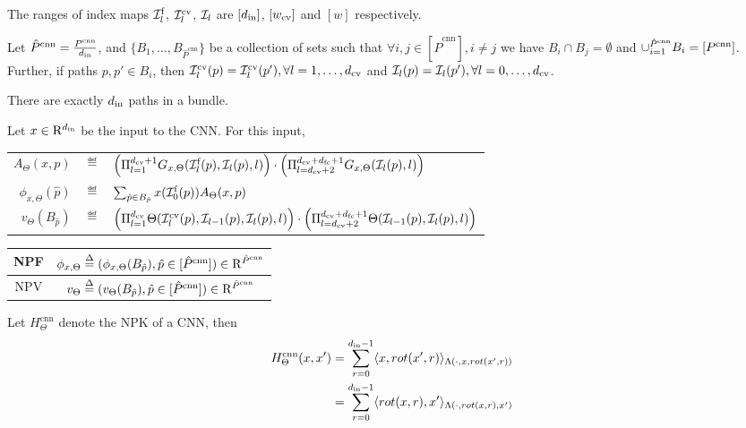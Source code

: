 \begin{notation}
The ranges of index maps $\mathcal{I}^{\text{f}}_l$,  $\mathcal{I}^{\text{cv}}_l$, $\mathcal{I}_l$ are $[d_{\text{in}}]$, $[w_{\text{cv}}]$ and $[w]$ respectively. 
\end{notation}

\begin{definition}\label{def:bundle}
Let $\hat{P}^{\text{cnn}}=\frac{P^{\text{cnn}}}{d_{\text{in}}}$, and $\{B_1,\ldots, B_{\hat{P}^{\text{cnn}}}\}$ be a collection of sets such that $\forall i,j\in [\hat{P}^{\text{cnn}}], i\neq j$ we have $B_i\cap B_j=\emptyset$ and $\cup_{i=1}^{\hat{P}^{\text{cnn}}}B_i =[P^{\text{cnn}}]$. Further,  if paths $p,p' \in B_i$, then $\mathcal{I}^{\text{cv}}_l(p)=\mathcal{I}^{\text{cv}}_l(p'), \forall l=1,\ldots, d_{\text{cv}}$ and $\mathcal{I}_l(p)=\mathcal{I}_l(p'), \forall l=0,\ldots, d_{\text{cv}}$.
\end{definition}

\begin{proposition}\label{prop:bundle}
There are exactly $d_{\text{in}}$ paths in a bundle.
\end{proposition}

\begin{definition}\label{def:convnps} Let $x\in\mathrm{R}^{d_{\text{in}}}$ be the input to the CNN. For this input, 
\begin{tabular}{rlp{4cm}}
$A_{\Theta}(x,p)$&$\eqdef$&$\left(\Pi_{l=1}^{d_{\text{cv}}+1} G_{x,\Theta}(\mathcal{I}^{\text{f}}_l(p),\mathcal{I}_l(p),l)\right)\cdot\left(\Pi_{l=d_{\text{cv}}+2}^{d_{\text{cv}}+d_{\text{fc}}+1} G_{x,\Theta}(\mathcal{I}_l(p),l)\right)$\\
$\phi_{x,\Theta}(\hat{p})$&$\eqdef$&$ \sum_{\hat{p}\in B_{\hat{p}}}x(\mathcal{I}^{\text{f}}_0(p))A_{\Theta}(x,p)$\\
$v_{\Theta}(B_{\hat{p}})$&$\eqdef$&$ \left(\Pi_{l=1}^{d_{\text{cv}}} \Theta(\mathcal{I}^{\text{cv}}_{l}(p),\mathcal{I}_{l-1}(p),\mathcal{I}_{l}(p),l)\right) \cdot\left( \Pi_{l=d_{\text{cv}}+2}^{d_{\text{cv}}+d_{\text{fc}}+1} \Theta(\mathcal{I}_{l-1}(p),\mathcal{I}_l(p),l)\right)$ 
\end{tabular}
\begin{center}
\begin{tabular}{|c|c|}\hline
NPF &$\phi_{x,\Theta}\stackrel{\Delta}{=} (\phi_{x,\Theta}(B_{\hat{p}}),\hat{p}\in [\hat{P}^{\text{cnn}}])\in\mathrm{R}^{\hat{P}^{\text{cnn}}}$\\\hline
NPV& $v_{\Theta}\stackrel{\Delta}{=} (v_{\Theta}(B_{\hat{p}}),\hat{p}\in [\hat{P}^{\text{cnn}}])\in\mathrm{R}^{\hat{P}^{\text{cnn}}}$\\\hline
\end{tabular}
\end{center}
\end{definition}

\begin{lemma}\label{lm:cnnnpk}
Let $H^{\text{cnn}}_{\Theta}$ denote the NPK of a CNN, then 
\begin{align*}
H^{\text{cnn}}_{\Theta}(x,x')&=\sum_{r=0}^{d_{\text{in}}-1} \langle x,rot(x',r)\rangle_{\Lambda(\cdot, x,rot(x',r))}\\&=\sum_{r=0}^{d_{\text{in}}-1} \langle rot(x,r),x'\rangle_{\Lambda(\cdot, rot(x,r),x')}
\end{align*}
\end{lemma}

